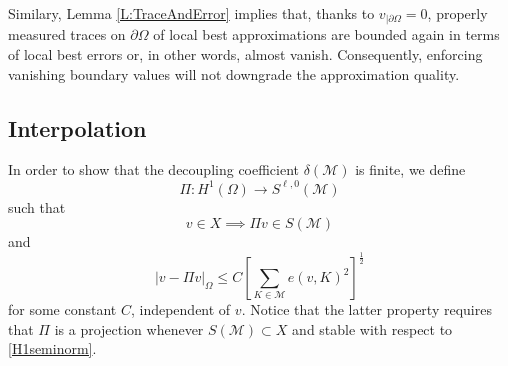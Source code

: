 \documentclass[a4paper]{amsart}
\numberwithin{equation}{section}
\theoremstyle{plain}
\theoremstyle{definition}
\begin{document}
Similary, Lemma \ref{L:TraceAndError} implies that, thanks to 
$v_{|\partial\Omega}=0$, properly measured traces on $\partial\Omega$ of local 
best approximations are bounded again in terms of local best errors or, in 
other words, almost vanish.  Consequently, enforcing vanishing boundary values 
will not downgrade the approximation quality.

\subsection{Interpolation}
In order to show that the decoupling coefficient ${\delta}({\mathcal{M}})$ is finite, 
we define
\[
 {\Pi}:{H^{{1}}}(\Omega)\to{S}^{{\ell},0}({\mathcal{M}})
\]
such that
\begin{equation}
\label{Ip;BdryVals}
 v\in X
 \implies
 {\Pi} v\in{S}({\mathcal{M}})
\end{equation}
and
\begin{equation}
\label{GDcplng}
 {\left|{v-{\Pi} v}\right|_{{\Omega}}}
 \leq
 C \left[
  \sum_{{K}\in{\mathcal{M}}} e(v,{K})^2
 \right]^{\frac12}
\end{equation}
for some constant $C$, independent of $v$.  Notice that the latter
property requires that ${\Pi}$ is a projection whenever ${S}({\mathcal{M}})
\subset X$ and stable with respect to \eqref{H1seminorm}.
\end{document}
